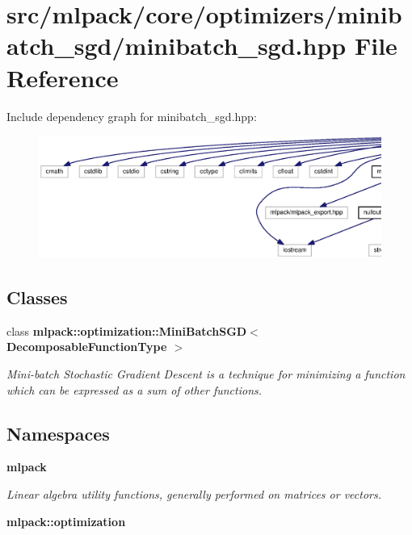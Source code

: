 \section{src/mlpack/core/optimizers/minibatch\+\_\+sgd/minibatch\+\_\+sgd.hpp File Reference}
\label{minibatch__sgd_8hpp}
Include dependency graph for minibatch\+\_\+sgd.\+hpp\+:
\nopagebreak
\begin{figure}[H]
\begin{center}
\leavevmode
\includegraphics[width=350pt]{minibatch__sgd_8hpp__incl}
\end{center}
\end{figure}
\subsection*{Classes}
\begin{DoxyCompactItemize}
\item 
class {\bf mlpack\+::optimization\+::\+Mini\+Batch\+S\+G\+D$<$ Decomposable\+Function\+Type $>$}
\begin{DoxyCompactList}\small\item\em Mini-\/batch Stochastic Gradient Descent is a technique for minimizing a function which can be expressed as a sum of other functions. \end{DoxyCompactList}\end{DoxyCompactItemize}
\subsection*{Namespaces}
\begin{DoxyCompactItemize}
\item 
 {\bf mlpack}
\begin{DoxyCompactList}\small\item\em Linear algebra utility functions, generally performed on matrices or vectors. \end{DoxyCompactList}\item 
 {\bf mlpack\+::optimization}
\end{DoxyCompactItemize}


